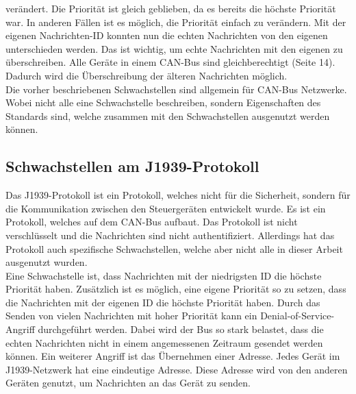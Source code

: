 verändert. Die Priorität ist gleich geblieben, da es bereits die höchste Priorität war. In anderen Fällen ist es möglich, die Priorität
einfach zu verändern. Mit der eigenen Nachrichten-ID konnten nun die 
echten Nachrichten von den eigenen unterschieden werden. Das ist wichtig, um echte Nachrichten mit den eigenen zu überschreiben. 
Alle Geräte in einem CAN-Bus sind gleichberechtigt\cite{Voss2008} (Seite 14). Dadurch wird die Überschreibung der älteren Nachrichten möglich.\\
Die vorher beschriebenen Schwachstellen sind allgemein für CAN-Bus Netzwerke. Wobei nicht alle eine Schwachstelle beschreiben, sondern 
Eigenschaften des Standards sind, welche zusammen mit den Schwachstellen ausgenutzt werden können.\\

\subsection{Schwachstellen am J1939-Protokoll}
Das J1939-Protokoll ist ein Protokoll, welches nicht für die Sicherheit, sondern für die Kommunikation zwischen den Steuergeräten
entwickelt wurde. Es ist ein Protokoll, welches auf dem CAN-Bus aufbaut. Das Protokoll ist nicht verschlüsselt und die Nachrichten
sind nicht authentifiziert. 
Allerdings hat das Protokoll auch spezifische Schwachstellen, welche aber nicht alle in dieser Arbeit ausgenutzt wurden.\\
Eine Schwachstelle ist, dass Nachrichten mit der niedrigsten ID die höchste Priorität haben. Zusätzlich ist es möglich, 
eine eigene Priorität so zu setzen, dass die Nachrichten mit der eigenen ID die höchste Priorität haben. Durch das Senden von
vielen Nachrichten mit hoher Priorität kann ein Denial-of-Service-Angriff durchgeführt werden. Dabei wird der Bus so stark belastet,
dass die echten Nachrichten nicht in einem angemessenen Zeitraum gesendet werden können. Ein weiterer Angriff ist das Übernehmen
einer Adresse. Jedes Gerät im J1939-Netzwerk hat eine eindeutige Adresse. Diese Adresse wird von den anderen Geräten genutzt, um
Nachrichten an das Gerät zu senden. 

